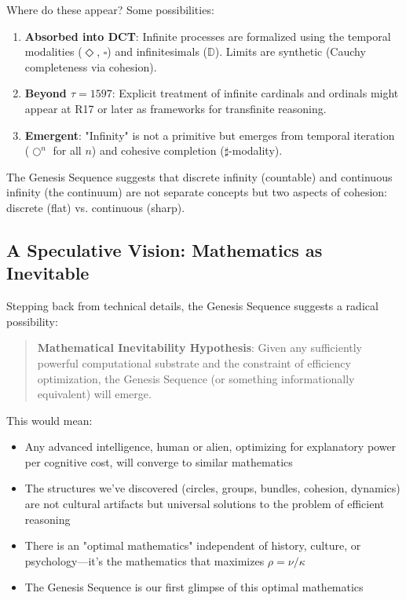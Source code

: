 \documentclass[11pt]{article}
\theoremstyle{definition}
\begin{document}
Where do these appear? Some possibilities:

\begin{enumerate}
\item \textbf{Absorbed into DCT}: Infinite processes are formalized using the temporal modalities ($\Diamond$, $\square$) and infinitesimals ($\mathbb{D}$). Limits are synthetic (Cauchy completeness via cohesion).

\item \textbf{Beyond $\tau=1597$}: Explicit treatment of infinite cardinals and ordinals might appear at R17 or later as frameworks for transfinite reasoning.

\item \textbf{Emergent}: "Infinity" is not a primitive but emerges from temporal iteration ($\bigcirc^n$ for all $n$) and cohesive completion ($\sharp$-modality).
\end{enumerate}

The Genesis Sequence suggests that discrete infinity (countable) and continuous infinity (the continuum) are not separate concepts but two aspects of cohesion: discrete (flat) vs. continuous (sharp).

\subsection{A Speculative Vision: Mathematics as Inevitable}

Stepping back from technical details, the Genesis Sequence suggests a radical possibility:

\begin{quote}
\textbf{Mathematical Inevitability Hypothesis}: Given any sufficiently powerful computational substrate and the constraint of efficiency optimization, the Genesis Sequence (or something informationally equivalent) will emerge.
\end{quote}

This would mean:
\begin{itemize}
\item Any advanced intelligence, human or alien, optimizing for explanatory power per cognitive cost, will converge to similar mathematics

\item The structures we've discovered (circles, groups, bundles, cohesion, dynamics) are not cultural artifacts but universal solutions to the problem of efficient reasoning

\item There is an "optimal mathematics" independent of history, culture, or psychology—it's the mathematics that maximizes $\rho = \nu/\kappa$

\item The Genesis Sequence is our first glimpse of this optimal mathematics
\end{itemize}
\end{document}
